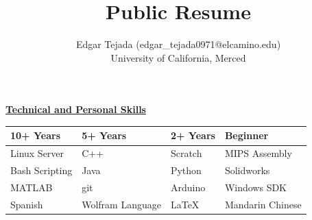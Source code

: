 \documentclass [11pt]{article}
\title{Public Resume}
\author{Edgar Tejada (edgar_tejada0971@elcamino.edu)\\University of California, Merced}
\begin{document}
\begin{flushleft}


\raggedright \underline{\textbf{Technical and Personal Skills}}
\linebreak
{
\centering
\begin{tabularx}{0.8\textwidth} { 
  | >{\centering\arraybackslash}X | 
  | >{\centering\arraybackslash}X | 
  | >{\centering\arraybackslash}X | 
  | >{\centering\arraybackslash}X |}

	\hline
	\textbf{10+ Years} & \textbf{5+ Years} & \textbf{2+ Years} & \textbf{Beginner}\\ [0.5ex]
	\hline
	Linux Server & C++ & Scratch & MIPS Assembly\\ [0.5ex]
	\hline
	Bash Scripting & Java & Python & Solidworks\\ [0.5ex]
	\hline
	MATLAB & git & Arduino & Windows SDK\\ [0.5ex]
	\hline
	Spanish & Wolfram Language & \LaTeX & Mandarin Chinese\\ [0.5ex]
	\hline
\end{tabularx}

}
\raggedright


\end{flushleft}
\end{document}
